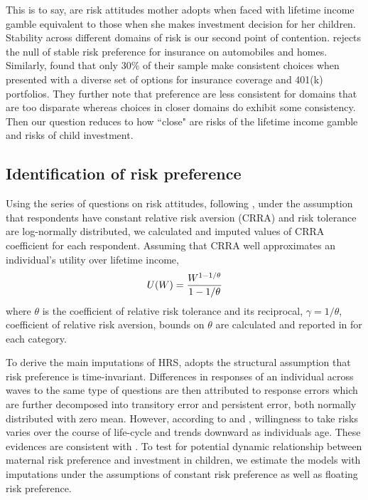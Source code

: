 \documentclass[]{article}
\begin{document}
\alert{This is to say, are risk attitudes mother adopts when faced with lifetime income gamble equivalent to those when she makes investment decision for her children. Stability across different domains of risk is our second point of contention. \citet{barseghyan2011risk} rejects the null of stable risk preference for insurance on automobiles and homes. Similarly, \citet{einav2012general} found that only 30\% of their sample make consistent choices when presented with a diverse set of options for insurance coverage and 401(k) portfolios. They further note that preference are less consistent for domains that are too disparate whereas choices in closer domains do exhibit some consistency. Then our question reduces to how ``close" are risks of the lifetime income gamble and risks of child investment.}


\subsection{Identification of risk preference}

Using the series of questions on risk attitudes, following \citet{kimball2008imputing,kimball2009risk}, under the assumption that respondents have constant relative risk aversion (CRRA) and risk tolerance are log-normally distributed, we calculated and imputed values of CRRA coefficient for each respondent. Assuming that CRRA well approximates an individual's utility over lifetime income,
\[U(W)={W^{1-{1/\theta}}\over 1-{1/\theta}}\]
where $\theta$ is the coefficient of relative risk tolerance and its reciprocal, $\gamma = 1/\theta$, coefficient of relative risk aversion, bounds on $\theta$ are calculated and reported in  for each category. 


To derive the main imputations of HRS, \citet{kimball2008imputing} adopts the structural assumption that risk preference is time-invariant. Differences in responses of an individual across waves to the same type of questions are then attributed to response errors which are further decomposed into transitory error and persistent error, both normally distributed with zero mean. However, according to \citet{dohmen2011individual} and \citet{dohmen2017risk}, willingness to take risks varies over the course of life-cycle and trends downward as individuals age. These evidences are consistent with \citet{sahm2012much}. To test for potential dynamic relationship between maternal risk preference and investment in children, we estimate the models with imputations under the assumptions of constant risk preference as well as floating risk preference. 
\end{document}
